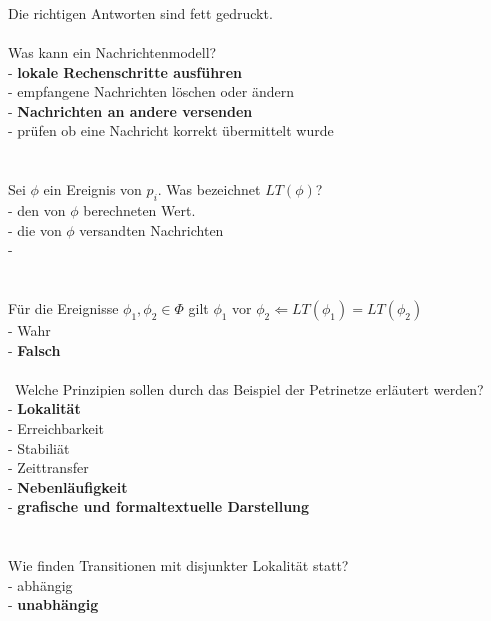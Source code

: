 \documentclass[a4paper,12pt]{scrartcl}
\begin{document}
\subsubsection{}
Die richtigen Antworten sind fett gedruckt.\\\\
Was kann ein Nachrichtenmodell?\\
- \textbf{lokale Rechenschritte ausführen}\\
- empfangene Nachrichten löschen oder ändern\\
- \textbf{Nachrichten an andere versenden}\\
- prüfen ob eine Nachricht korrekt übermittelt wurde\\\\\\
Sei $\phi$ ein Ereignis von $p_i$. Was bezeichnet $LT(\phi)$?\\
- den von $\phi$ berechneten Wert.\\
- die von $\phi$ versandten Nachrichten\\
-  \\\\\\
Für die Ereignisse $\phi_1 ,\phi_2\in\Phi$ gilt $\phi_1$ vor $\phi_2\Leftarrow LT(\phi_1)=LT(\phi_2)$\\
- Wahr\\
- \textbf{Falsch}\\\\\
Welche Prinzipien sollen durch das Beispiel der Petrinetze erläutert werden?\\
- \textbf{Lokalität}\\
- Erreichbarkeit\\
- Stabiliät\\
- Zeittransfer\\
- \textbf{Nebenläufigkeit}\\
- \textbf{grafische und formaltextuelle Darstellung}\\\\\\
Wie finden Transitionen mit disjunkter Lokalität statt?\\
- abhängig\\
- \textbf{unabhängig}\\
\end{document}
